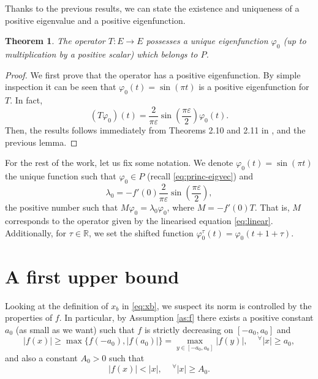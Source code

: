 \documentclass[a4paper,11pt]{article}
\theoremstyle{plain}
\newtheorem{thm}{Theorem}[section]
\theoremstyle{definition}
\theoremstyle{definition}
\newcommand{\R}{\mathbb{R}}
\numberwithin{equation}{section}
\begin{document}
Thanks to the previous results, we can state the existence and uniqueness of a positive eigenvalue and a positive eigenfunction.

\begin{thm}
	The operator $T\colon E \to E$ possesses a unique eigenfunction $\varphi_0$ (up to multiplication by a positive scalar) which belongs to $P$.
\end{thm}
\begin{proof}
We first prove that the operator has a positive eigenfunction. By simple inspection it can be seen that $\varphi_0(t) = \sin(\pi t)$ is a positive eigenfunction for $T$. In fact,
\[
    (T\varphi_0)(t) = \frac{2}{\pi\varepsilon} \sin\left( \frac{\pi\varepsilon}{2} \right)\varphi_0(t).
\]
Then, the results follows immediately from Theorems 2.10 and 2.11 in \cite{MAK}, and the previous lemma.
\end{proof}

For the rest of the work, let us fix some notation. We denote $\varphi_0(t) =\sin(\pi t)$ the unique function such that $\varphi_0\in P$ (recall \eqref{eq:princ-eigvec}) and 
\begin{equation}\label{eq:princ-eigval}
    \lambda_0 = -f'(0)\frac{2}{\pi\varepsilon}\sin\left( \frac{\pi\varepsilon}{2}  \right),
\end{equation}
the positive number such that $M\varphi_0 = \lambda_0 \varphi_0$, where $M = -f'(0)T$. That is, $M$ corresponds to the operator given by the linearised equation \eqref{eq:linear}. Additionally, for $\tau\in\R$, we set the shifted function $\varphi_0^\tau(t) = \varphi_0(t+1+\tau)$.

\section{A first upper bound}\label{sec:space}


Looking at the definition of $x_b$ in \eqref{eq:xb}, we suspect its norm is controlled by the properties of $f$. In particular, by Assumption \ref{as:f} there exists a positive constant $a_0$ (as small as we want) such that $f$ is strictly decreasing on $[-a_0,a_0]$ and
\begin{equation}\label{eventual_posi}
    |f(x)| \geq \max\{f(-a_0), |f(a_0)|\} = \max_{y\in[-a_0,a_0]} |f(y)|, \quad \,^\forall |x|\geq a_0,
\end{equation}
and also a constant $A_0>0$ such that 
\begin{equation}\label{diag_cond}
    |f(x)| < |x|, \quad \,^\forall |x|\geq A_0.
\end{equation}
\end{document}

